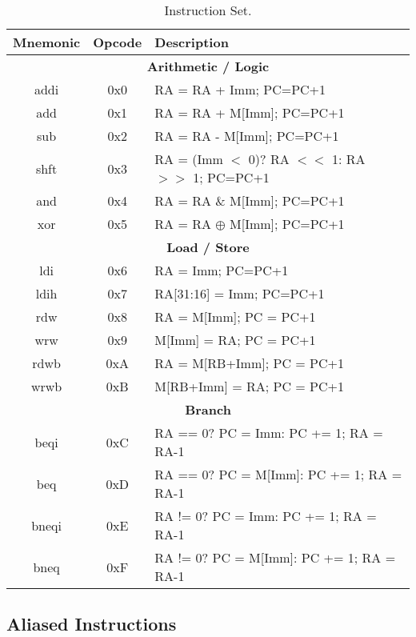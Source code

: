 \begin{table}[!htbp]
  \centering
    \begin{tabular}{|c|c|p{8cm}|}
    \hline 
    {\bf Mnemonic} & {\bf Opcode} & {\bf Description} \\
    \hline \hline 
% 
\multicolumn{3}{|c|}{{\bf Arithmetic / Logic}}\\
\hline \hline
    addi  & 0x0 & RA = RA + Imm; PC=PC+1\\
    \hline
    add   & 0x1 & RA = RA + M[Imm]; PC=PC+1\\
    \hline
    sub   & 0x2 & RA = RA - M[Imm]; PC=PC+1\\
    \hline
    shft  & 0x3 & RA = (Imm $<$ 0)? RA $<<$ 1: RA $>>$ 1; PC=PC+1\\
    \hline
    and   & 0x4 & RA = RA \& M[Imm]; PC=PC+1\\
    \hline
    xor   & 0x5 & RA = RA $\oplus$ M[Imm]; PC=PC+1\\
    \hline
\multicolumn{3}{|c|}{{\bf Load / Store}}\\
\hline \hline
    ldi   & 0x6 & RA = Imm; PC=PC+1\\
    \hline
    ldih  & 0x7 & RA[31:16] = Imm; PC=PC+1\\
    \hline
    rdw   & 0x8 & RA = M[Imm]; PC = PC+1\\
    \hline
    wrw   & 0x9 & M[Imm] = RA; PC = PC+1\\
    \hline
    rdwb  & 0xA & RA = M[RB+Imm]; PC = PC+1\\
    \hline
    wrwb  & 0xB & M[RB+Imm] = RA; PC = PC+1\\
    \hline
\multicolumn{3}{|c|}{{\bf Branch}}\\
\hline \hline
    beqi  & 0xC & RA == 0? PC = Imm: PC += 1; RA = RA-1\\
    \hline
    beq   & 0xD & RA == 0? PC = M[Imm]: PC += 1; RA = RA-1\\
    \hline
    bneqi & 0xE & RA != 0? PC = Imm: PC += 1; RA = RA-1\\
    \hline
    bneq  & 0xF & RA != 0? PC = M[Imm]: PC += 1; RA = RA-1\\
    \hline
    
    \end{tabular}
  \caption{Instruction Set.}
  \label{tab:isa}
\end{table}

\subsection{Aliased Instructions}

